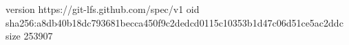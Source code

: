 version https://git-lfs.github.com/spec/v1
oid sha256:a8db40b18dc793681becca450f9c2dedcd0115c10353b1d47c06d51ce5ac2ddc
size 253907
